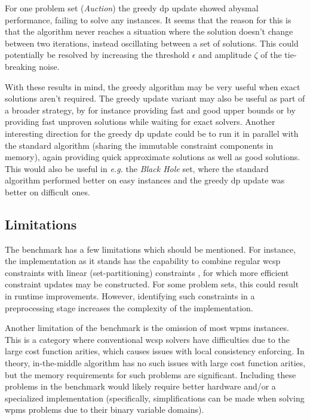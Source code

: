 For one problem set (\emph{Auction}) the greedy \gls{dp} update showed abysmal performance, failing to solve any instances.
It seems that the reason for this is that the algorithm never reaches a situation where the solution doesn't change between two iterations, instead oscillating between a set of solutions.
This could potentially be resolved by increasing the threshold \(\epsilon\) and amplitude \(\zeta\) of the tie-breaking noise.

With these results in mind, the greedy algorithm may be very useful when exact solutions aren't required.
The greedy update variant may also be useful as part of a broader strategy, by for instance providing fast and good upper bounds or by providing fast unproven solutions while waiting for exact solvers.
Another interesting direction for the greedy \gls{dp} update could be to run it in parallel with the standard algorithm (sharing the immutable constraint components in memory), again providing quick approximate solutions as well as good solutions.
This would also be useful in \emph{e.g.} the \emph{Black Hole} set, where the standard algorithm performed better on easy instances and the greedy \gls{dp} update was better on difficult ones.

\subsection{Limitations}
The benchmark has a few limitations which should be mentioned.
For instance, the implementation as it stands has the capability to combine regular \gls{wcsp} constraints with linear (set-partitioning) constraints \parencite[\pno~102]{Wedelin08}, for which more efficient constraint updates may be constructed.
For some problem sets, this could result in runtime improvements.
However, identifying such constraints in a preprocessing stage increases the complexity of the implementation.

Another limitation of the benchmark is the omission of most \gls{wpms} instances.
This is a category where conventional \gls{wcsp} solvers have difficulties due to the large cost function arities, which causes issues with local consistency enforcing.
In theory, in-the-middle algorithm has no such issues with large cost function arities, but the memory requirements for such problems are significant.
Including these problems in the benchmark would likely require better hardware and/or a specialized implementation (specifically, simplifications can be made when solving \gls{wpms} problems due to their binary variable domains).

